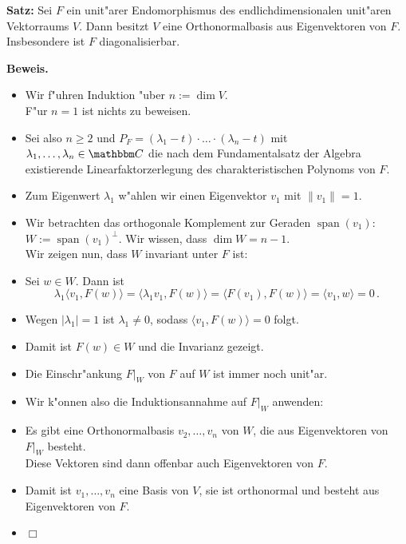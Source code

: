 \documentclass[a4paper%
]{report}
\DeclareMathOperator{\Span}{span}
\begin{document}
\Large

{\bfseries Satz:} Sei $F$ ein unit"arer Endomorphismus des
endlichdimensionalen unit"aren Vektorraums $V$. Dann besitzt $V$ eine
Orthonormalbasis aus Eigenvektoren von $F$. Insbesondere ist $F$
diagonalisierbar.
\medskip

{\bfseries Beweis.}

\begin{itemize}[\mbox{}]
\addtolength{\itemsep}{4mm}
\item Wir f"uhren Induktion "uber $n:=\dim V$. 
\\ F"ur $n = 1$ ist nichts zu beweisen.
\item Sei also $n \ge 2$ und $P_F = (\lambda_1 - t) \cdot \ldots \cdot
  (\lambda_n - t)$ mit $\lambda_1, \ldots, \lambda_n \in \C$
  die nach dem Fundamentalsatz der Algebra existierende
  Linearfaktorzerlegung des charakteristischen Polynoms von $F$.
\item Zum Eigenwert $\lambda_1$ w"ahlen wir einen Eigenvektor $v_1$
  mit $\|v_1\| = 1$. 
\item Wir betrachten das orthogonale Komplement zur Geraden
  $\Span(v_1)$: $W:= \Span(v_1)^\perp$.
\quad Wir wissen, dass $\dim W = n-1$.
\\ Wir zeigen nun, dass $W$ invariant unter $F$ ist:
\item Sei $w \in W$. %
   Dann ist $$\lambda_1 \langle v_1, F(w) \rangle
  = \langle \lambda_1 v_1, F(w) \rangle = \langle F(v_1), F(w) \rangle
  = \langle v_1, w \rangle = 0 \,.$$
\item Wegen $|\lambda_1|=1$ ist $\lambda_1 \neq 0$, sodass $\langle
  v_1, F(w) \rangle = 0$ folgt.
\item Damit ist $F(w) \in W$ und die Invarianz gezeigt.
\item Die Einschr"ankung $F|_W$ von $F$ auf $W$ ist immer noch
  unit"ar.
\item Wir k"onnen also die Induktionsannahme auf $F|_W$
  anwenden:
\item Es gibt eine Orthonormalbasis $v_2, \ldots, v_n$ von $W$, die
  aus Eigenvektoren von $F|_W$ besteht.
\\ Diese Vektoren sind dann offenbar auch Eigenvektoren von $F$.
\item Damit ist $v_1, \ldots, v_n$ eine Basis von $V$, sie ist orthonormal
  und besteht aus Eigenvektoren von $F$.
\item \hfill $\Box$
\end{itemize}
  
\end{document}
